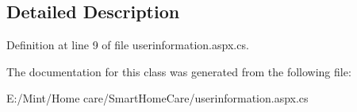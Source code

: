 \subsection{Detailed Description}


Definition at line 9 of file userinformation.\-aspx.\-cs.



The documentation for this class was generated from the following file\-:\begin{DoxyCompactItemize}
\item 
E\-:/\-Mint/\-Home care/\-Smart\-Home\-Care/userinformation.\-aspx.\-cs\end{DoxyCompactItemize}
